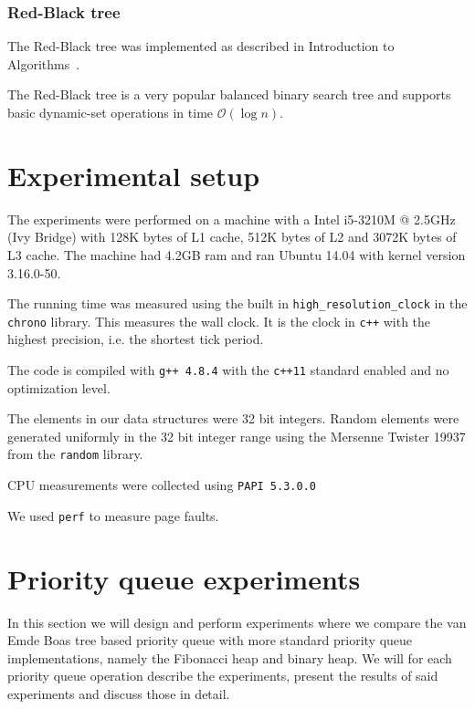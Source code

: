 \documentclass[a4paper,oneside,article,11pt]{memoir}
\begin{document}

\subsection{Red-Black tree}
The Red-Black tree was implemented as described in Introduction to Algorithms~\cite{clrs}.

The Red-Black tree is a very popular balanced binary search tree and supports basic dynamic-set operations in time $\mathcal{O}(\log n)$.

\chapter{Experimental setup}
\label{chtp:experiment_setup}

The experiments were performed on a machine with a Intel i5-3210M @ 2.5GHz (Ivy Bridge) with 128K bytes of L1 cache, 512K bytes of L2 and 3072K bytes of L3 cache. The machine had 4.2GB ram and ran Ubuntu 14.04 with kernel version 3.16.0-50.

The running time was measured using the built in \texttt{high\_resolution\_clock} in the \texttt{chrono} library. This measures the wall clock. It is the clock in \texttt{c++} with the highest precision, i.e. the shortest tick period.

The code is compiled with \texttt{g++ 4.8.4} with the \texttt{c++11} standard enabled and no optimization level.

The elements in our data structures were 32 bit integers. Random elements were generated uniformly in the 32 bit integer range using the Mersenne Twister 19937 from the \texttt{random} library.

CPU measurements were collected using \texttt{PAPI 5.3.0.0}

We used \texttt{perf} to measure page faults.

\chapter{Priority queue experiments}
\label{chap:pqe}
In this section we will design and perform experiments where we compare the van Emde Boas tree based priority queue with more standard priority queue implementations, namely the Fibonacci heap and binary heap. We will for each priority queue operation describe the experiments, present the results of said experiments and discuss those in detail.
\end{document}
